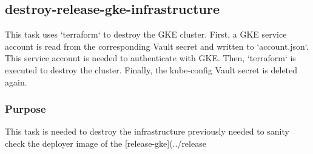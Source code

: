 \subsection{destroy-release-gke-infrastructure}\label{subsec:destroy-release-gke-infrastructure}

This task uses `terraform` to destroy the GKE cluster.
First, a GKE service account is read from the corresponding Vault secret and written to `account.json`.
This service account is needed to authenticate with GKE.
Then, `terraform` is executed to destroy the cluster.
Finally, the kube-config Vault secret is deleted again.

\subsubsection{Purpose}\label{subsubsec:drgi-Purpose}

This task is needed to destroy the infrastructure previously needed to sanity check the deployer image of the [release-gke](../release%
